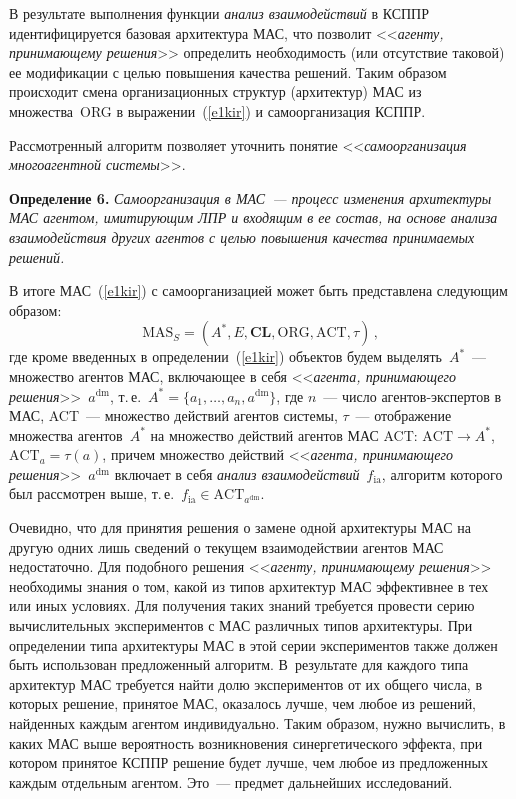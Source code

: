 \begin{multicols}{2}
  В результате выполнения функции \textit{анализ взаимодействий} в \mbox{КСППР} 
идентифицируется базовая архитектура МАС, что позволит <<\textit{агенту, 
принимающему решения}>> определить необходимость (или отсутствие 
таковой) ее модификации с целью повышения качества решений. Таким 
образом происходит смена организационных структур (архитектур) МАС из 
множества~ORG в выражении~(\ref{e1kir}) и самоорганизация \mbox{КСППР}.
  
  Рассмотренный алгоритм позволяет уточнить понятие 
<<\textit{самоорганизация многоагентной системы}>>.
  
  \smallskip
  
  \noindent
  \textbf{Определение 6.} \textit{Самоорганизация в МАС~--- процесс изменения 
архитектуры МАС агентом, имитиру\-ющим ЛПР и входящим в ее состав, на основе 
анализа взаимодействия других агентов с целью повышения качества принимаемых 
решений.}
  
  \smallskip
  
  В итоге МАС~(\ref{e1kir}) с самоорганизацией может быть представлена 
следующим образом:
$$
\mathrm{MAS}_S = (A^*, E, \mathbf{CL}, \mathrm{ORG}, \mathrm{ACT}, \tau)\,,
  $$
    где кроме введенных в определении~(\ref{e1kir}) объектов будем 
выделять~$A^*$~--- множество агентов МАС, включающее в себя 
<<\textit{агента, принимающего решения}>>~$a^{\mathrm{dm}}$, т.\,е.\ $A^*=\{a_1,\ldots , 
a_n,a^{\mathrm{dm}}\}$, где $n$~--- чис\-ло агентов-экспертов в МАС, ACT~--- 
множество действий агентов системы, $\tau$~--- отображение множества 
агентов~$A^*$ на множество действий агентов МАС ACT: $\mathrm{ACT}\rightarrow 
A^*$, $\mathrm{ACT}_a=\tau(a)$, причем множество действий <<\textit{агента, 
принимающего решения}>>~$a^{\mathrm{dm}}$ включает в себя \textit{анализ 
взаимодействий}~$f_{\mathrm{ia}}$, алгоритм которого был рассмотрен выше, т.\,е.\ 
$f_{\mathrm{ia}} \in \mathrm{ACT}_{a^{\mathrm{dm}}}$.
  
  Очевидно, что для принятия решения о замене одной архитектуры МАС на 
другую одних лишь сведений о текущем взаимодействии агентов МАС 
недостаточно. Для подобного решения <<\textit{агенту, принимающему 
решения}>> необходимы знания о том, какой из типов архитектур МАС 
эффективнее в тех или иных условиях. Для получения таких знаний требуется 
провести серию вычислительных экспериментов с МАС различных типов 
архитектуры. При определении типа архитектуры МАС в этой серии 
экспериментов также должен быть использован предложенный алгоритм. 
В~результате для каждого типа архитектур МАС требуется найти долю 
экспериментов от их общего числа, в которых решение, принятое МАС, 
оказалось лучше, чем любое из решений, найденных каждым агентом 
индивидуально. Таким образом, нужно вычислить, в каких МАС выше 
вероятность возникновения синергетического эффекта, при котором принятое 
\mbox{КСППР} решение будет лучше, чем любое из предложенных каждым отдельным 
агентом. Это~--- предмет дальнейших исследований.


\end{multicols}
